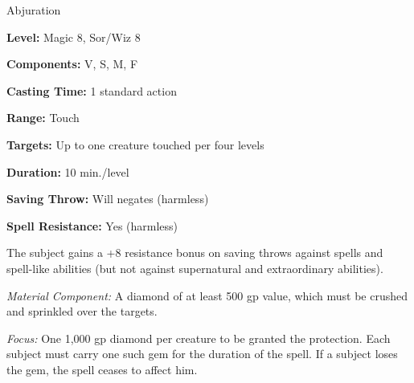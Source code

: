 
Abjuration

\textbf{Level:} Magic 8, Sor/Wiz 8

\textbf{Components:} V, S, M, F

\textbf{Casting Time:} 1 standard action

\textbf{Range:} Touch

\textbf{Targets:} Up to one creature touched per four levels

\textbf{Duration:} 10 min./level

\textbf{Saving Throw:} Will negates (harmless)

\textbf{Spell Resistance:} Yes (harmless)

The subject gains a +8 resistance bonus on saving throws against spells and spell-like 
abilities (but not against supernatural and extraordinary abilities).

\textit{Material Component:} A diamond of at least 500 gp value, which must be 
crushed and sprinkled over the targets.

\textit{Focus:} One 1,000 gp diamond per creature to be granted the protection. 
Each subject must carry one such gem for the duration of the spell. If a subject 
loses the gem, the spell ceases to affect him.

